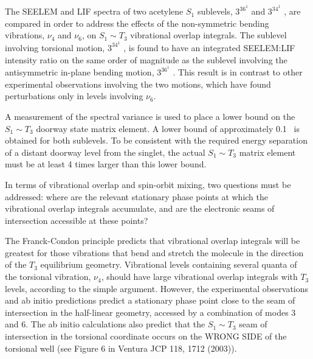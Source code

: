 \documentclass[12pt]{mitthesis}
\begin{document}
The SEELEM and LIF spectra of two acetylene $S_1$ sublevels, $3^36^1$
 and $3^34^1$ , are compared in order to address the
effects of the non-symmetric bending vibrations, $\nu_4$ and $\nu_6$,
on $S_1 \sim T_3$ vibrational overlap integrals.  The sublevel
involving torsional motion, $3^34^1$ , is found to have an
integrated SEELEM:LIF intensity ratio on the same order of magnitude
as the sublevel involving the antisymmetric in-plane bending motion,
$3^36^1$ .  This result is in contrast to other experimental
observations involving the two motions, which have found perturbations
only in levels involving $\nu_6$.

A measurement of the spectral variance is used to place a lower bound
on the $S_1 \sim T_3$ doorway state matrix element.  A lower bound of
approximately 0.1 \rcm\ is obtained for both sublevels.  To be
consistent with the required energy separation of a distant doorway
level from the singlet, the actual $S_1 \sim T_3$ matrix element must
be at least 4 times larger than this lower bound.


In terms of vibrational overlap and spin-orbit mixing, two questions
must be addressed: where are the relevant stationary phase points
at which the vibrational overlap integrals accumulate, and are the
electronic seams of intersection accessible at these points?  

The Franck-Condon principle predicts that vibrational overlap
integrals will be greatest for those vibrations that bend and stretch
the molecule in the direction of the $T_3$ equilibrium geometry.
Vibrational levels containing several quanta of the torsional
vibration, $\nu_4$, should have large vibrational overlap integrals
with $T_3$ levels, according to the simple argument.  However, the
experimental observations and ab initio predictions predict a
stationary phase point close to the seam of intersection in the
half-linear geometry, accessed by a combination of modes 3 and 6.  The
ab initio calculations also predict that the $S_1 \sim T_3$ seam of
intersection in the torsional coordinate occurs on the WRONG SIDE of
the torsional well (see Figure 6 in Ventura JCP 118, 1712 (2003)).
\end{document}
